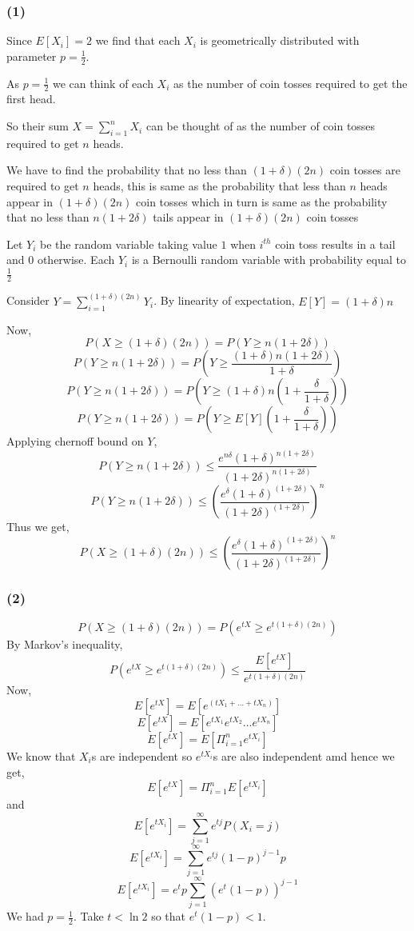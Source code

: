 \documentclass[a4paper]{article}
\begin{document}
\subsubsection*{(1)}
Since $E[X_i] = 2$ we find that each $X_i$ is geometrically distributed with parameter $p=\frac{1}{2}$.

As $p=\frac{1}{2}$ we can think of each $X_i$ as the number of coin tosses required to get the first head.

So their sum $X = \sum_{i=1}^nX_i$ can be thought of as the number of coin tosses required to get $n$ heads.

We have to find the probability that no less than $(1+\delta)(2n)$ coin tosses are required to get $n$ heads, this is same as the probability that less than $n$ heads appear in $(1+\delta)(2n)$ coin tosses which in turn is same as the probability that no less than $n(1+2\delta)$ tails appear in $(1+\delta)(2n)$ coin tosses

Let $Y_i$ be the random variable taking value $1$ when $i^{th}$ coin toss results in a tail and $0$ otherwise. Each $Y_i$ is a Bernoulli random variable with probability equal to $\frac{1}{2}$

Consider $Y = \sum_{i=1}^{(1+\delta)(2n)}Y_i$. By linearity of expectation, $E[Y] = (1+\delta)n$

Now, $$P(X \geq (1+\delta)(2n)) = P(Y \geq n(1+2\delta))$$
$$P(Y \geq n(1+2\delta)) = P\left(Y \geq \frac{(1+\delta)n(1+2\delta)}{1+\delta}\right)$$
$$P(Y \geq n(1+2\delta)) = P\left(Y \geq (1+\delta)n\left(1+\frac{\delta}{1+\delta}\right)\right)$$
$$P(Y \geq n(1+2\delta)) = P\left(Y \geq E[Y]\left(1+\frac{\delta}{1+\delta}\right)\right)$$
Applying chernoff bound on $Y$,
$$P(Y \geq n(1+2\delta)) \leq \frac{e^{n\delta}(1+\delta)^{n(1+2\delta)}}{(1+2\delta)^{n(1+2\delta)}}$$
$$P(Y \geq n(1+2\delta)) \leq \left(\frac{e^{\delta}(1+\delta)^{(1+2\delta)}}{(1+2\delta)^{(1+2\delta)}}\right)^n$$
Thus we get,
$$P(X \geq (1+\delta)(2n)) \leq \left(\frac{e^{\delta}(1+\delta)^{(1+2\delta)}}{(1+2\delta)^{(1+2\delta)}}\right)^n$$
\subsubsection*{(2)}
$$P(X \geq (1+\delta)(2n)) = P(e^{tX} \geq e^{t(1+\delta)(2n)})$$
By Markov's inequality,
$$P(e^{tX} \geq e^{t(1+\delta)(2n)}) \leq \frac{E[e^{tX}]}{e^{t(1+\delta)(2n)}}$$
Now,
$$E[e^{tX}] = E[e^{(tX_1 + ... + tX_n)}]$$
$$E[e^{tX}] = E[e^{tX_1}e^{tX_2}...e^{tX_n}]$$
$$E[e^{tX}] = E[\Pi_{i=1}^ne^{tX_i}]$$
We know that $X_i$s are independent so $e^{tX_i}$s are also independent amd hence we get,
$$E[e^{tX}] = \Pi_{i=1}^nE[e^{tX_i}]$$
and $$E[e^{tX_i}] = \sum_{j=1}^\infty e^{tj}P(X_i=j)$$
$$E[e^{tX_i}] = \sum_{j=1}^\infty e^{tj}(1-p)^{j-1}p$$
$$E[e^{tX_i}] = e^tp\sum_{j=1}^\infty {(e^t(1-p))}^{j-1}$$
We had $p=\frac{1}{2}$. Take $t < \ln 2$ so that $e^t(1-p) < 1$.
\end{document}
